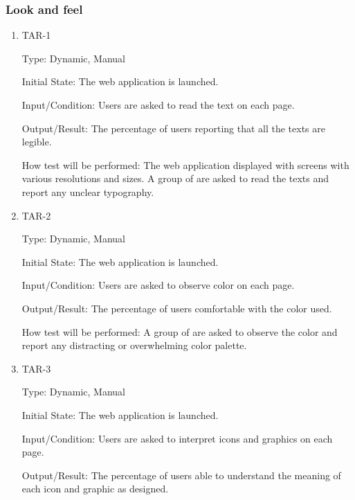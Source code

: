 \documentclass[12pt, titlepage]{article}
\begin{document}


\subsubsection{Look and feel}
		

\begin{enumerate}

\item{TAR-1\\}

Type: Dynamic, Manual
					
Initial State: The web application is launched.
					
Input/Condition: Users are asked to read the text on each page.
					
Output/Result: The percentage of users reporting that all the texts are legible.
					
How test will be performed: The web application displayed with screens with various resolutions and sizes. A group of are asked to read the texts and report any unclear typography.
					
\item{TAR-2\\}

Type: Dynamic, Manual
					
Initial State: The web application is launched.
					
Input/Condition: Users are asked to observe color on each page.
					
Output/Result: The percentage of users comfortable with the color used.
					
How test will be performed: A group of are asked to observe the color and report any distracting or overwhelming color palette.

\item{TAR-3\\}

Type: Dynamic, Manual
					
Initial State: The web application is launched.
					
Input/Condition: Users are asked to interpret icons and graphics on each page.
					
Output/Result: The percentage of users able to understand the meaning of each icon and graphic as designed.
					

\end{enumerate}
\end{document}
